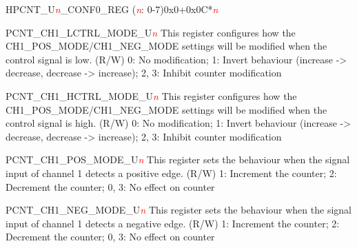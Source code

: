 \begin{register}{H}{PCNT\_U\textit{\textcolor{red}{\it{n}}}\_CONF0\_REG (\textcolor{red}{\it{n}}: 0-7)}{0x0+0x0C*\textcolor{red}{\it{n}}}\label{regdesc:PCNTUnCONF0REG}
%
%
%
%
%
%
%
%
%
%
%
%
%
%
%
\regnewline%
\begin{regdesc}\begin{reglist}
\item [PCNT\_CH1\_LCTRL\_MODE\_U\textcolor{red}{\it{n}}]This register configures how the CH1\_POS\_MODE/CH1\_NEG\_MODE settings will be modified when the control signal is low. (R/W) 0: No modification; 1: Invert behaviour (increase ->  decrease, decrease ->  increase); 2, 3: Inhibit counter modification
\item [PCNT\_CH1\_HCTRL\_MODE\_U\textcolor{red}{\it{n}}]This register configures how the CH1\_POS\_MODE/CH1\_NEG\_MODE settings will be modified when the control signal is high. (R/W) 0: No modification; 1: Invert behaviour (increase ->  decrease, decrease ->  increase); 2, 3: Inhibit counter modification
\item [PCNT\_CH1\_POS\_MODE\_U\textcolor{red}{\it{n}}]This register sets the behaviour when the signal input of channel 1 detects a positive edge. (R/W) 1: Increment the counter; 2: Decrement the counter; 0, 3: No effect on counter
\item [PCNT\_CH1\_NEG\_MODE\_U\textcolor{red}{\it{n}}]This register sets the behaviour when the signal input of channel 1 detects a negative edge. (R/W) 1: Increment the counter; 2: Decrement the counter; 0, 3: No effect on counter

\end{reglist}
\end{regdesc}
\end{register}
